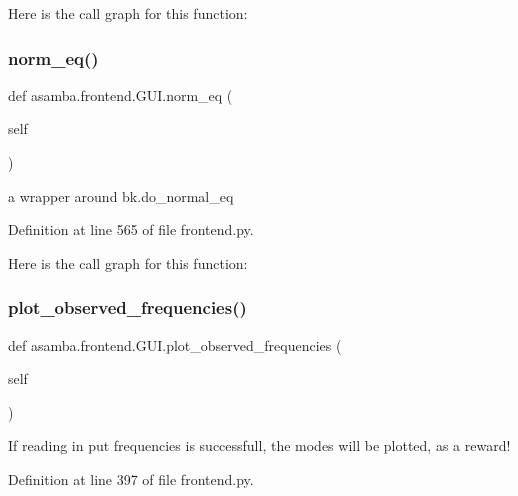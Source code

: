 Here is the call graph for this function\+:
\mbox{\label{classasamba_1_1frontend_1_1_g_u_i_a0e5bd5cd537353b15645f21196606524}} 
\subsubsection{\texorpdfstring{norm\+\_\+eq()}{norm\_eq()}}
{\footnotesize\ttfamily def asamba.\+frontend.\+G\+U\+I.\+norm\+\_\+eq (\begin{DoxyParamCaption}\item[{}]{self }\end{DoxyParamCaption})}

\begin{DoxyVerb}a wrapper around bk.do_normal_eq \end{DoxyVerb}
 

Definition at line 565 of file frontend.\+py.

Here is the call graph for this function\+:
\mbox{\label{classasamba_1_1frontend_1_1_g_u_i_addc94b5d78cdf85660cc6b2b61377252}} 
\subsubsection{\texorpdfstring{plot\+\_\+observed\+\_\+frequencies()}{plot\_observed\_frequencies()}}
{\footnotesize\ttfamily def asamba.\+frontend.\+G\+U\+I.\+plot\+\_\+observed\+\_\+frequencies (\begin{DoxyParamCaption}\item[{}]{self }\end{DoxyParamCaption})}

\begin{DoxyVerb}If reading in put frequencies is successfull, the modes will be plotted, as a reward! \end{DoxyVerb}
 

Definition at line 397 of file frontend.\+py.

